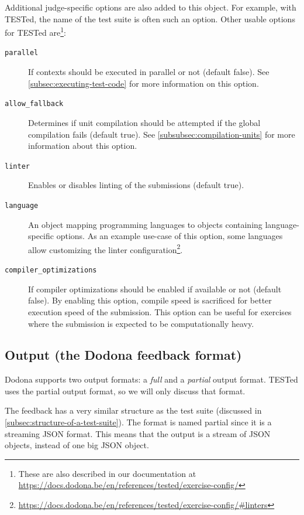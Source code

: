 \documentclass[../main]{subfiles}
\begin{document}
Additional judge-specific options are also added to this object.
For example, with TESTed, the name of the test suite is often such an option.
Other usable options for TESTed are\footnote{These are also described in our documentation at \url{https://docs.dodona.be/en/references/tested/exercise-config/}}:

\begin{description}
    \item[\texttt{parallel}] If contexts should be executed in parallel or not (default false). See \cref{subsec:executing-test-code} for more information on this option.
    \item[\texttt{allow\_fallback}] Determines if unit compilation should be attempted if the global compilation fails (default true). See \cref{subsubsec:compilation-units} for more information about this option.
    \item[\texttt{linter}] Enables or disables linting of the submissions (default true).
    \item[\texttt{language}] An object mapping programming languages to objects containing language-specific options.
     As an example use-case of this option, some languages allow customizing the linter configuration\footnote{\url{https://docs.dodona.be/en/references/tested/exercise-config/\#linters}}.
    \item[\texttt{compiler\_optimizations}] If compiler optimizations should be enabled if available or not (default false).
    By enabling this option, compile speed is sacrificed for better execution speed of the submission.
    This option can be useful for exercises where the submission is expected to be computationally heavy.
\end{description}

\subsection{Output (the Dodona feedback format)}\label{subsec:dodona-output}

Dodona supports two output formats: a \emph{full} and a \emph{partial} output format.
TESTed uses the partial output format, so we will only discuss that format.

The feedback has a very similar structure as the test suite (discussed in \cref{subsec:structure-of-a-test-suite}).
The format is named partial since it is a streaming JSON format.
This means that the output is a stream of JSON objects, instead of one big JSON object.
\end{document}
